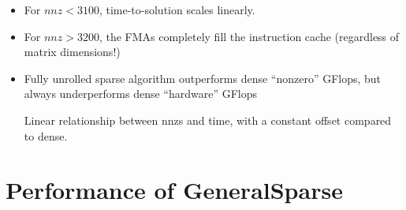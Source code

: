   \begin{itemize}
    \item For $nnz < 3100$, time-to-solution scales linearly.
    \item For $nnz > 3200$, the FMAs completely fill the instruction cache (regardless of matrix dimensions!)
    \item Fully unrolled sparse algorithm outperforms dense ``nonzero'' GFlops, but always underperforms dense ``hardware'' GFlops
    

    Linear relationship between nnzs and time, with a constant offset compared to dense.

  \end{itemize} 


\section{Performance of GeneralSparse}

